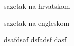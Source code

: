 \documentclass[seminar]{FSBtex}
\begin{document}
\titlepage



\begin{AbstractHR}
sazetak na hrvatskom
\end{AbstractHR}

\begin{AbstractEN}
sazetak na engleskom
\end{AbstractEN}


\begin{SeminarAssignment}
dsafdsaf dsfadsf dasf 
\end{SeminarAssignment}
\end{document}
